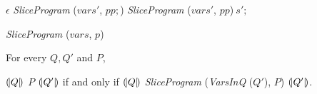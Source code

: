 \begin{algorithm}
  \begin{algorithmic}[1]
      \Case{$\epsilon$}
        \Return $\epsilon$
      \EndCase
            \Return \textit{SliceProgram} ($\mathit{vars}'$, $pp;$)
          \EndCase
            \Return \textit{SliceProgram} ($\mathit{vars}'$, $pp$)$\ s';$
          \EndCase
        \EndMatch
      \EndCase
    \EndMatch
  \end{algorithmic}
  \caption{\textit{SliceProgram} ($\mathit{vars}$, $p$)}
\end{algorithm}

\begin{theorem}
  For every $Q, Q'$ and $P$,
  \begin{center}
  ${(\!|}{Q}{|\!)}$ $P$ ${(\!|}{Q'}{|\!)}$ if and only if
  ${(\!|}{Q}{|\!)}$ \textit{SliceProgram} (\textit{VarsInQ} ($Q'$), $P$)
  ${(\!|}{Q'}{|\!)}$.
  \end{center}

\end{theorem}